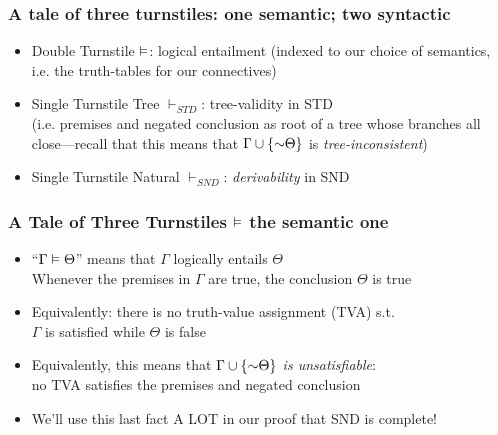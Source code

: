 \begin{frame}
\frametitle{A tale of three turnstiles: one semantic; two syntactic}

\begin{itemize}[<+->]

\item Double Turnstile $\vDash$: logical entailment (indexed to our choice of semantics, i.e. the truth-tables for our connectives)

\item Single Turnstile Tree $\vdash_{STD}$: tree-validity in STD \\ (i.e. premises and negated conclusion as root of a tree whose branches all close---recall that this means that $\Gamma \cup \{\enot \Theta\}$ is \emph{tree-inconsistent}) %

\item Single Turnstile Natural $\vdash_{SND}$: \emph{derivability} in SND

\end{itemize}
\end{frame}

\begin{frame}
\frametitle{A Tale of Three Turnstiles $\vDash$ the semantic one}

\begin{itemize}[<+->]


\item ``$\Gamma \vDash \Theta$'' means that $\Gamma$ logically entails $\Theta$ \\ Whenever the premises in $\Gamma$ are true, the conclusion $\Theta$ is true 

\item Equivalently: there is no truth-value assignment (TVA) s.t. \\ $\Gamma$ is satisfied while $\Theta$ is false

\item Equivalently, this means that \emph{$\Gamma \cup \{\enot \Theta\}$ is unsatisfiable}: \\ no TVA satisfies the premises and negated conclusion  

\item We'll use this last fact A LOT in our proof that SND is complete! %

\end{itemize}
\end{frame}




